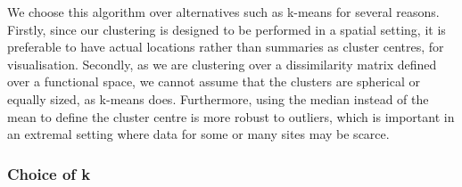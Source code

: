\documentclass[
  12pt]{article}
\begin{document}
We choose this algorithm over alternatives such as k-means for several reasons. 
Firstly, since our clustering is designed to be performed in a spatial setting, it is preferable to have actual locations rather than summaries as cluster centres, for visualisation.
Secondly, as we are clustering over a dissimilarity matrix defined over a functional space, we cannot assume that the clusters are spherical or equally sized, as k-means does. 
Furthermore, using the median instead of the mean to define the cluster centre is more robust to outliers, which is important in an extremal setting where data for some or many sites may be scarce. 

\subsubsection{Choice of k}~\label{subsubsec:choose_k}
\end{document}
